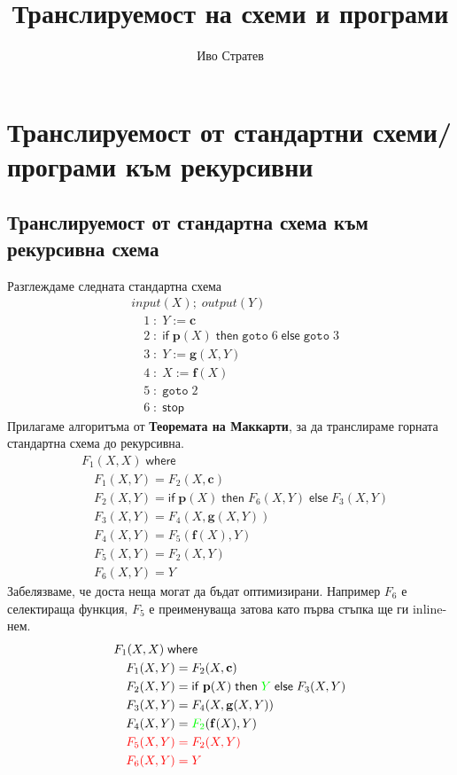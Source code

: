 \documentclass[14pt]{extarticle}
\title{Транслируемост на схеми и програми}
\author{Иво Стратев}
\begin{document}
\maketitle
\section*{Транслируемост от стандартни схеми/програми към рекурсивни}
\subsection*{Транслируемост от стандартна схема към рекурсивна схема}
Разглеждаме следната стандартна схема
\begin{align*}
    & input(X); \; output(Y) \\
    & \quad 1 \; : \; Y := \mathbf c \\
    & \quad 2 \; : \; \mathsf{if} \; \mathbf p(X) \; \mathsf{then} \; \mathtt{goto} \; 6  \; \mathsf{else} \; \mathtt{goto} \; 3 \\
    & \quad 3 \; : \; Y := \mathbf g(X, Y) \\
    & \quad 4 \; : \; X := \mathbf f(X) \\
    & \quad 5 \; : \; \mathtt{goto} \; 2 \\
    & \quad 6 \; : \; \mathsf{stop}
\end{align*}
Прилагаме алгоритъма от \textbf{Теоремата на Маккарти}, за да транслираме горната стандартна схема до рекурсивна.
\begin{align*}
    & F_1(X, X) \; \mathsf{where} \\
    & \quad  F_1(X, Y) = F_2(X, \mathbf c) \\
    & \quad F_2(X, Y) = \mathsf{if} \; \mathbf p(X) \; \mathsf{then} \; F_6(X, Y)  \; \mathsf{else} \; F_3(X, Y) \\
    & \quad F_3(X, Y) = F_4(X, \mathbf g(X, Y)) \\
    & \quad F_4(X, Y) = F_5(\mathbf f(X), Y) \\
    & \quad F_5(X, Y) = F_2(X, Y) \\
    & \quad F_6(X, Y) = Y
\end{align*}
Забелязваме, че доста неща могат да бъдат оптимизирани.
Например \(F_6\) е селектираща функция, \(F_5\) е преименуваща затова като първа стъпка ще ги inline-нем.
\begin{align*}
    & F_1(X, X) \; \mathsf{where} \\
    & \quad  F_1(X, Y) = F_2(X, \mathbf c) \\
    & \quad F_2(X, Y) = \mathsf{if} \; \mathbf p(X) \; \mathsf{then} \; \textcolor{green}{Y}  \; \mathsf{else} \; F_3(X, Y) \\
    & \quad F_3(X, Y) = F_4(X, \mathbf g(X, Y)) \\
    & \quad F_4(X, Y) = \textcolor{green}{F_2}(\mathbf f(X), Y) \\
    & \quad \color{red} F_5(X, Y) = F_2(X, Y) \\
    & \quad \color{red} F_6(X, Y) = Y
\end{align*}
\end{document}

